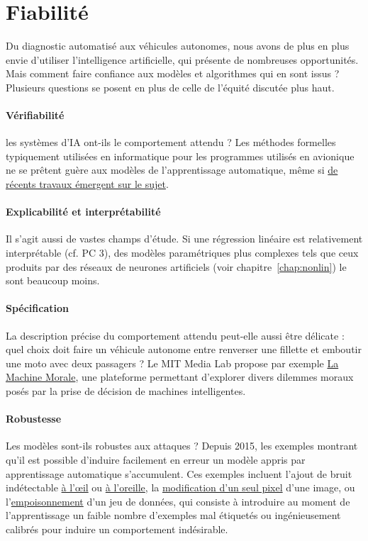 \section{Fiabilité}
Du diagnostic automatisé aux véhicules autonomes, nous avons de plus en plus
envie d'utiliser l'intelligence artificielle, qui présente de nombreuses
opportunités. Mais comment faire confiance aux modèles et algorithmes qui en
sont issus ? Plusieurs questions se posent en plus de celle de l'équité
discutée plus haut.

\paragraph{Vérifiabilité} les systèmes d'IA ont-ils le comportement attendu ?
Les méthodes formelles typiquement utilisées en informatique pour les
programmes utilisés en avionique ne se prêtent guère aux modèles de
l'apprentissage automatique, même si \href{https://formal-paris-saclay.fr/}{de
récents travaux émergent sur le sujet}.

\paragraph{Explicabilité et interprétabilité} Il s'agit aussi de vastes champs
d'étude. Si une régression linéaire est relativement interprétable (cf. PC 3),
des modèles paramétriques plus complexes tels que ceux produits par des réseaux
de neurones artificiels (voir chapitre~\ref{chap:nonlin}) le
sont beaucoup moins. 

\paragraph{Spécification} La description précise du comportement attendu
peut-elle aussi être délicate : quel choix doit faire un véhicule autonome
entre renverser une fillette et emboutir une moto avec deux passagers ? Le MIT
Media Lab propose par exemple \href{http://moralmachine.mit.edu/hl/fr}{La
  Machine Morale}, une plateforme permettant d'explorer divers dilemmes moraux
posés par la prise de décision de machines intelligentes.

\paragraph{Robustesse} Les modèles sont-ils robustes aux attaques ? Depuis
2015, les exemples montrant qu'il est possible d'induire facilement en erreur
un modèle appris par apprentissage automatique s'accumulent. Ces exemples
incluent l'ajout de bruit
indétectable \href{https://arxiv.org/abs/1412.6572}{à l'\oe{}il} ou
\href{https://nicholas.carlini.com/code/audio\_adversarial\_examples}{à
  l'oreille}, la \href{https://arxiv.org/abs/1710.08864}{modification d'un seul
  pixel} d'une image, ou
l'\href{https://towardsdatascience.com/poisoning-attacks-on-machine-learning-1ff247c254db}{empoisonnement}
d'un jeu de données, qui consiste à introduire au moment de l'apprentissage un
faible nombre d'exemples mal étiquetés ou ingénieusement calibrés pour induire
un comportement indésirable.

